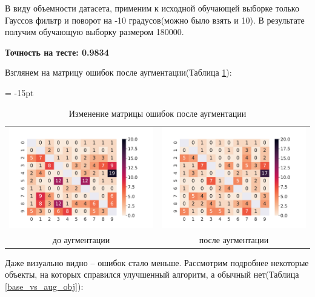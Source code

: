 \documentclass[12pt,fleqn]{article}
\begin{document}
В виду объемности датасета, применим к исходной обучающей выборке только Гауссов фильтр и поворот на -10 градусов(можно было взять и 10).
В результате получим обучающую выборку размером 180000.

\newpage
\textbf{Точность на тесте: 0.9834}

Взглянем на матрицу ошибок после аугментации(Таблица \ref{conf_matrix_aug}):

\begin{table}[htb]
    \centering
    \tabcolsep = -15pt
    \begin{tabular}{cc}
        \includegraphics[width=10cm]{task4.pdf} & \includegraphics[width=10cm]{task5_conf_mat.pdf}\\
        до аугментации & после аугментации 
    \end{tabular}
    \caption{Изменение матрицы ошибок после аугментации}
    \label{conf_matrix_aug}
\end{table}

Даже визуально видно -- ошибок стало меньше. Рассмотрим подробнее некоторые объекты, 
на которых справился улучшенный алгоритм, а обычный нет(Таблица \ref{base_vs_aug_obj}):
\end{document}
